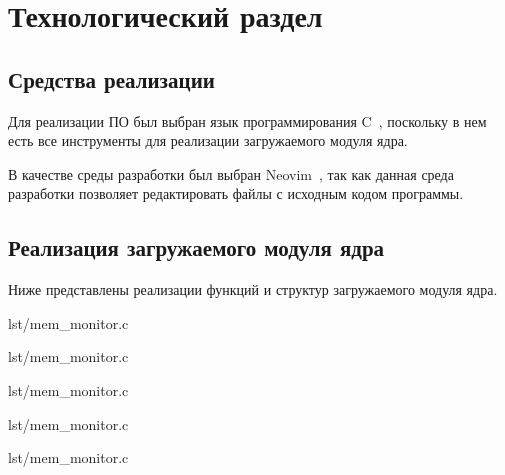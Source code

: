\section{Технологический раздел}

\subsection{Средства реализации}

Для реализации ПО был выбран язык программирования C~\cite{c}, поскольку в нем есть все инструменты для реализации загружаемого модуля ядра.

В качестве среды разработки был выбран Neovim~\cite{neovim}, так как данная среда разработки позволяет редактировать файлы с исходным кодом программы.

\subsection{Реализация загружаемого модуля ядра}

Ниже представлены реализации функций и структур загружаемого модуля ядра.

\begin{lstinputlisting}[
        label={lst:},
        caption={Структура struct mem\_alloc\_entry для логирования информации},
        firstline=23,
        lastline=31,
    ]{lst/mem_monitor.c}
\end{lstinputlisting}

\begin{lstinputlisting}[
        label={lst:},
        caption={Функция pre\_kmalloc\_handler},
        firstline=48,
        lastline=74,
    ]{lst/mem_monitor.c}
\end{lstinputlisting}

\begin{lstinputlisting}[
        label={lst:},
        caption={Функция pre\_kmem\_cache\_alloc\_handler},
        firstline=160,
        lastline=202,
    ]{lst/mem_monitor.c}
\end{lstinputlisting}

\begin{lstinputlisting}[
        label={lst:},
        caption={Проба kp\_kmalloc},
        firstline=204,
        lastline=207,
    ]{lst/mem_monitor.c}
\end{lstinputlisting}

\begin{lstinputlisting}[
        label={lst:},
        caption={Проба kp\_kmalloc},
        firstline=224,
        lastline=227,
    ]{lst/mem_monitor.c}
\end{lstinputlisting}

